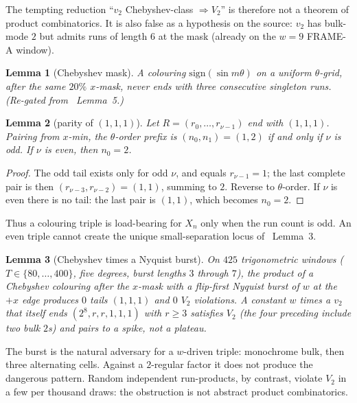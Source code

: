 \documentclass[11pt]{article}
\newtheorem{lemma}{Lemma}
\theoremstyle{remark}
\begin{document}
The tempting reduction ``$v_2$ Chebyshev-class $\Rightarrow V_2$''
is therefore not a theorem of product combinatorics.  It is also
false as a hypothesis on the source: $v_2$ has bulk-mode $2$ but
admits runs of length $6$ at the mask (already on the $w=9$
FRAME-A window).

\begin{lemma}[Chebyshev mask]\label{lem:cheb}
A colouring $\mathrm{sign}(\sin m\theta)$ on a uniform
$\theta$-grid, after the same $20\%$ $x$-mask, never ends with
three consecutive singleton runs.  (Re-gated from~\cite{xn}
Lemma~5.)
\end{lemma}

\begin{lemma}[parity of $(1,1,1)$]\label{lem:parity}
Let $R=(r_0,\ldots,r_{\nu-1})$ end with $(1,1,1)$.  Pairing from
$x$-min, the $\theta$-order prefix is $(n_0,n_1)=(1,2)$ if and
only if $\nu$ is odd.  If $\nu$ is even, then $n_0=2$.
\end{lemma}

\begin{proof}
The odd tail exists only for odd $\nu$, and equals $r_{\nu-1}=1$;
the last complete pair is then $(r_{\nu-3},r_{\nu-2})=(1,1)$,
summing to $2$.  Reverse to $\theta$-order.  If $\nu$ is even there
is no tail: the last pair is $(1,1)$, which becomes $n_0=2$.
\end{proof}

Thus a colouring triple is load-bearing for $X_n$ only when the
run count is odd.  An even triple cannot create the unique
small-separation locus of~\cite{xn} Lemma~3.

\begin{lemma}[Chebyshev times a Nyquist burst]\label{lem:cheb-burst}
On $425$ trigonometric windows ($T\in\{80,\ldots,400\}$, five
degrees, burst lengths $3$ through $7$), the product of a
Chebyshev colouring after the $x$-mask with a flip-first Nyquist
burst of $w$ at the $+x$ edge produces $0$ tails $(1,1,1)$ and
$0$ $V_2$ violations.  A constant $w$ times a $v_2$ that itself
ends $(2^8,r,r,1,1,1)$ with $r\ge 3$ satisfies $V_2$ (the four
preceding include two bulk $2$s) and pairs to a spike, not a
plateau.
\end{lemma}

The burst is the natural adversary for a $w$-driven triple:
monochrome bulk, then three alternating cells.  Against a
$2$-regular factor it does not produce the dangerous pattern.
Random independent run-products, by contrast, violate $V_2$ in a
few per thousand draws: the obstruction is not abstract product
combinatorics.
\end{document}
